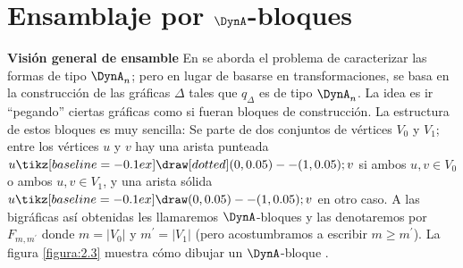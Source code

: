 \section{Ensamblaje por $\DynA$-bloques}
\textbf{Visión general de ensamble}
En \citep{Barot1999ACO} se aborda el problema de caracterizar las formas de tipo $\DynA_{n}$; pero en lugar de basarse en transformaciones, se basa en la construcción de las gráficas $\Delta$ tales que $q_{\Delta}$ es de tipo  $\DynA_{n}$. La idea es ir ``pegando'' ciertas gráficas como si fueran bloques de construcción. La estructura de estos bloques es muy sencilla: Se parte de dos conjuntos de vértices $V_{0}$ y $V_{1}$; entre los vértices $u$ y $v$ hay una arista punteada $u\tikz[baseline=-0.1ex]\draw [dotted] (0,0.05) -- (1,0.05); v$ si ambos $u, v \in V_{0}$ o ambos $u, v \in V_{1}$, y una arista sólida $u \tikz[baseline=-0.1ex]\draw (0,0.05) -- (1,0.05); v$ en otro caso. A las bigráficas así obtenidas les llamaremos $\DynA$-bloques y las denotaremos por $F_{m,m^{'}}$ donde $m = |V_{0}|$ y $m^{'} = |V_{1}|$ (pero acostumbramos a escribir $m \geq m^{'}$). La figura \ref{figura:2.3} muestra cómo dibujar un $\DynA$-bloque \citep{AbarcaSoteloMarioAlberto2011Apds}\citep{Barot1999ACO} .

